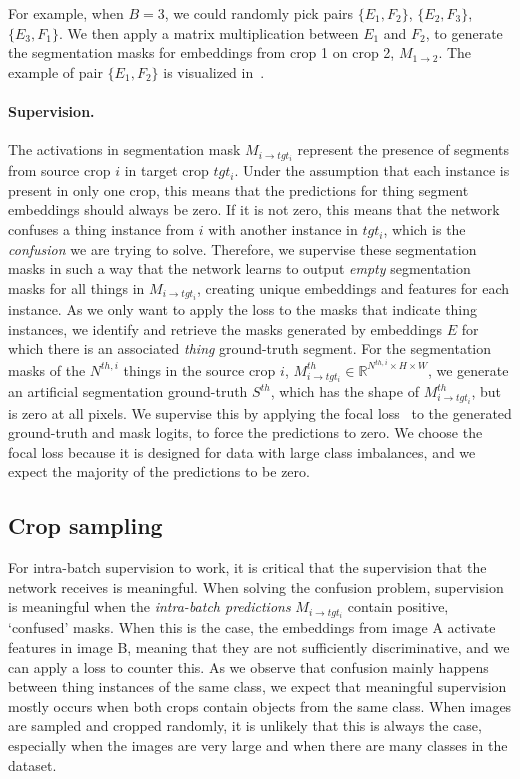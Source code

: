 \documentclass[10pt,twocolumn,letterpaper]{article}
\begin{document}
For example, when $B=3$, we could randomly pick pairs $\{{E_1},{F_{2}}\}$, $\{{E_2},{F_{3}}\}$, $\{{E_3},{F_{1}}\}$. We then apply a matrix multiplication between $E_1$ and $F_2$, to generate the segmentation masks for embeddings from crop 1 on crop 2, $M_{1\rightarrow{2}}$. The example of pair $\{{E_1},{F_{2}}\}$ is visualized in~.


\paragraph{Supervision.}
The activations in segmentation mask $M_{i\rightarrow{tgt_{i}}}$ represent the presence of segments from source crop $i$ in target crop $tgt_{i}$. Under the assumption that each instance is present in only one crop, this means that the predictions for thing segment embeddings should always be zero. If it is not zero, this means that the network confuses a thing instance from $i$ with another instance in $tgt_i$, which is the \textit{confusion} we are trying to solve. Therefore, we supervise these segmentation masks in such a way that the network learns to output \textit{empty} segmentation masks for all things in $M_{i\rightarrow{tgt_{i}}}$, creating unique embeddings and features for each instance. As we only want to apply the loss to the masks that indicate thing instances, we identify and retrieve the masks generated by embeddings $E$ for which there is an associated \textit{thing} ground-truth segment. For the segmentation masks of the $N^{th,i}$ things in the source crop $i$, $M^{th}_{i\rightarrow{tgt_{i}}} \in \mathbb{R}^{{N^{th,i}}\times{H}\times{W}}$, we generate an artificial segmentation ground-truth $S^{th}$, which has the shape of $M^{th}_{i\rightarrow{tgt_{i}}}$, but is zero at all pixels. We supervise this by applying the focal loss~\cite{lin2017focal} to the generated ground-truth and mask logits, to force the predictions to zero. We choose the focal loss because it is designed for data with large class imbalances, and we expect the majority of the predictions to be zero. 


\subsection{Crop sampling}
For intra-batch supervision to work, it is critical that the supervision that the network receives is meaningful. When solving the confusion problem, supervision is meaningful when the \textit{intra-batch predictions} $M_{i\rightarrow{tgt_{i}}}$ contain positive, `confused' masks. When this is the case, the embeddings from image A activate features in image B, meaning that they are not sufficiently discriminative, and we can apply a loss to counter this. As we observe that confusion mainly happens between thing instances of the same class, we expect that meaningful supervision mostly occurs when both crops contain objects from the same class. When images are sampled and cropped randomly, it is unlikely that this is always the case, especially when the images are very large and when there are many classes in the dataset. 
\end{document}
